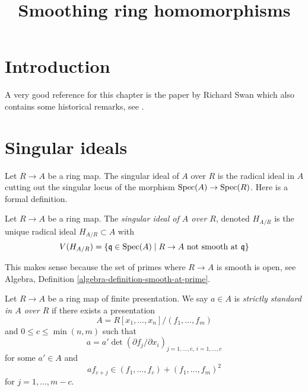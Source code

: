 

%


\title{Smoothing ring homomorphisms}


\maketitle

\label{section-phantom}

\tableofcontents

\section{Introduction}
\label{section-introduction}

\noindent
A very good reference for this chapter is the paper by Richard Swan which
also contains some historical remarks, see \cite{swan}.







\section{Singular ideals}
\label{section-singular-ideal}

\noindent
Let $R \to A$ be a ring map. The singular ideal of $A$ over $R$
is the radical ideal in $A$ cutting out the singular locus of the
morphism $\mathop{\rm Spec}(A) \to \mathop{\rm Spec}(R)$. Here is a formal definition.

\begin{definition}
\label{definition-singular-ideal}
Let $R \to A$ be a ring map. The {\it singular ideal of $A$ over $R$},
denoted $H_{A/R}$ is the unique radical ideal $H_{A/R} \subset A$ with
$$
V(H_{A/R}) = \{\mathfrak q \in \mathop{\rm Spec}(A) \mid R \to A
\text{ not smooth at }\mathfrak q\}
$$
\end{definition}

\noindent
This makes sense because the set of primes where $R \to A$ is smooth
is open, see
Algebra, Definition \ref{algebra-definition-smooth-at-prime}.

\begin{definition}
\label{definition-strictly-standard}
Let $R \to A$ be a ring map of finite presentation.
We say $a \in A$ is {\it strictly standard in $A$ over $R$}
if there exists a presentation
$$
A = R[x_1, \ldots, x_n]/(f_1, \ldots, f_m)
$$
and $0 \leq c \leq \min(n, m)$ such that
\begin{equation}
\label{equation-standard-one}
a = a' \det (\partial f_j/\partial x_i)_{j = 1, \ldots, c, \ i = 1, \ldots, c}
\end{equation}
for some $a' \in A$ and
\begin{equation}
\label{equation-standard-two}
a f_{c + j} \in (f_1, \ldots, f_c) + (f_1, \ldots, f_m)^2
\end{equation}
for $j = 1, \ldots, m - c$.
\end{definition}

